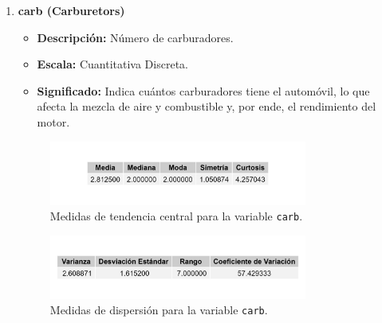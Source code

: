 \documentclass{article}
\begin{document}
\begin{enumerate}
	\item \textbf{carb (Carburetors)}

	      \begin{itemize}
		      \item \textbf{Descripción:} Número de carburadores.
		      \item \textbf{Escala:} Cuantitativa Discreta.
		      \item \textbf{Significado:} Indica cuántos carburadores tiene el automóvil, lo que afecta la mezcla de aire y combustible y, por ende, el rendimiento del motor.
	      \end{itemize}

	      \begin{figure}[H]
		      \centering
		      \includegraphics[width=0.8\textwidth]{MTC/carb_central.png}
		      \caption{Medidas de tendencia central para la variable \texttt{carb}.}
		      \label{fig:carb_central}
	      \end{figure}

	      \begin{figure}[H]
		      \centering
		      \includegraphics[width=0.8\textwidth]{MTC/carb_dispersion.png}
		      \caption{Medidas de dispersión para la variable \texttt{carb}.}
		      \label{fig:carb_dispersion}
	      \end{figure}
	    

\end{enumerate}
\end{document}
